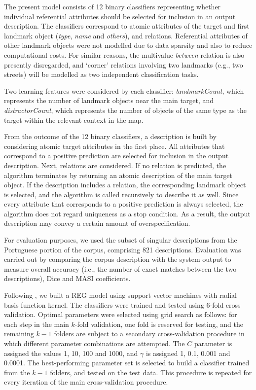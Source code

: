 \documentclass[11pt]{article}
\begin{document}
The present model consists of 12 binary classifiers representing whether individual referential attributes should be selected for inclusion in an output description. The classifiers correspond to atomic attributes of the target and first landmark object ({\em type}, {\em name} and {\em others}), and relations. Referential attributes of other landmark objects were not modelled due to data sparsity and also to reduce computational costs. For similar reasons, the multivalue {\em between} relation is also presently disregarded, and `corner' relations involving two landmarks (e.g., two streets) will be modelled as two independent classification tasks.

Two learning features were considered by each classifier: {\em landmarkCount}, which represents the number of landmark objects near the main target, and {\em distractorCount}, which represents the number of objects of the same type as the target within the relevant context in the map.

From the outcome of the 12 binary classifiers, a description is built by considering atomic target attributes in the first place. All attributes that correspond to a positive prediction are selected for inclusion in the output description. Next, relations are considered. If no relation is predicted, the algorithm terminates by returning an atomic description  of the main target object. If the description includes a relation, the corresponding landmark object is selected, and the algorithm is called recursively to describe it as well. Since every attribute that corresponds to a positive prediction is always selected, the algorithm does not regard uniqueness as a stop condition. As a result, the output description may convey a certain amount of overspecification.

For evaluation purposes, we used the subset of singular descriptions from the Portuguese portion of the corpus, comprising 821 descriptions. Evaluation was carried out by comparing the corpus description with the system output to measure overall accuracy (i.e., the number of exact matches between the two descriptions), Dice \cite{dice} and MASI \cite{masi} coefficients.%

Following \cite{thiago-svm}, we built a REG model using support vector machines with radial basis function kernel. The classifiers were trained and tested using 6-fold cross validation. Optimal parameters were selected using grid search as follows: for each step in the main $k$-fold validation, one fold is reserved for testing, and the remaining $k-1$ folders are subject  to a secondary cross-validation procedure in which different parameter combinations are attempted. The $C$ parameter is assigned the values 1, 10, 100 and 1000, and $\gamma$ is assigned 1, 0.1, 0.001 and 0.0001. The best-performing parameter set is selected to build a classifier trained from the $k-1$ folders, and tested on the test data. This procedure is repeated for every iteration of the main cross-validation procedure.
\end{document}
